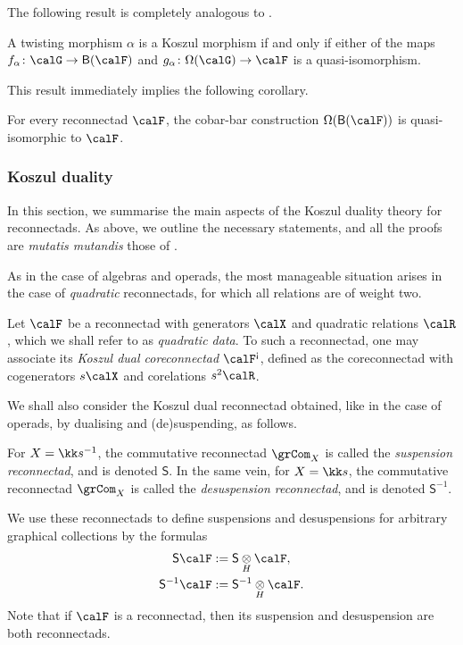 The following result is completely analogous to \cite[Th.~6.6.2]{MR2954392}.

\begin{prop}
A twisting morphism $\alpha$ is a Koszul morphism if and only if either of the maps $f_\alpha\colon\calG\to\mathsf{B}(\calF)$ and $g_\alpha\colon\Omega(\calG)\to\calF$ is a quasi-isomorphism.
\end{prop}

This result immediately implies the following corollary.

\begin{coro}
For every reconnectad $\calF$, the cobar-bar construction $\Omega(\mathsf{B}(\calF))$ is quasi-isomorphic to $\calF$. 
\end{coro}

\subsubsection{Koszul duality}

In this section, we summarise the main aspects of the Koszul duality theory for reconnectads. As above, we outline the necessary statements, and all the proofs are \emph{mutatis mutandis} those of \cite[Chap.~7]{MR2954392}. 

As in the case of algebras and operads, the most manageable situation arises in the case of \emph{quadratic} reconnectads, for which all relations are of weight two. 

\begin{defi}
Let $\calF$ be a reconnectad with generators $\calX$ and quadratic relations $\calR$, which we shall refer to as \emph{quadratic data}. To such a reconnectad, one may associate its \emph{Koszul dual coreconnectad} $\calF^{\text{!`}}$, defined as the coreconnectad with cogenerators $s\calX$ and corelations $s^2\calR$. 
\end{defi}

We shall also consider the Koszul dual reconnectad obtained, like in the case of operads, by dualising and (de)suspending, as follows.

\begin{defi} For $X=\kk s^{-1}$, the commutative reconnectad $\grCom_X$ is called the \emph{suspension reconnectad}, and is denoted $\mathsf{S}$. In the same vein, for $X=\kk s$, the commutative reconnectad $\grCom_X$ is called the \emph{desuspension reconnectad}, and is denoted $\mathsf{S}^{-1}$. 

We use these reconnectads to define suspensions and desuspensions for arbitrary graphical collections by the formulas
\begin{gather*}
\mathsf{S}\calF:=\mathsf{S}\underset{H}{\otimes}\calF,\\
\mathsf{S}^{-1}\calF:=\mathsf{S}^{-1}\underset{H}{\otimes}\calF.
\end{gather*}
Note that if $\calF$ is a reconnectad, then its suspension and desuspension are both reconnectads.
\end{defi} 

